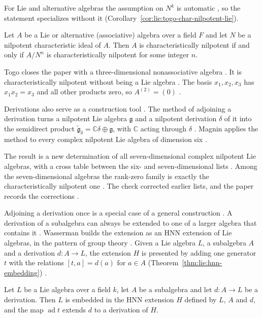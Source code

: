 For Lie and alternative algebras the assumption on $N^{k}$ is automatic
\cite[p.~211]{Togo1969}, so the statement specializes without it
(Corollary~\ref{cor:lie:togo-char-nilpotent-lie}).

\begin{corollary}\label{cor:lie:togo-char-nilpotent-lie}
Let $A$ be a Lie or alternative (associative) algebra over a field $F$
and let $N$ be a nilpotent characteristic ideal of $A$.  Then $A$ is
characteristically nilpotent if and only if $A/N^{n}$ is characteristically
nilpotent for some integer $n$.
\end{corollary}

Togo closes the paper with a three-dimensional nonassociative algebra
\cite[p.~211]{Togo1969}. It is characteristically nilpotent without being a
Lie algebra \cite[p.~211]{Togo1969}. The basis $x_1,x_2,x_3$ has $x_1x_2=x_3$
and all other products zero, so $A^{(2)}=(0)$ \cite[p.~211]{Togo1969}.

Derivations also serve as a construction tool \cite[p.~724]{Magnin2009}. The
method of adjoining a derivation turns a nilpotent Lie algebra $\mathfrak{g}$
and a nilpotent derivation $\delta$ of it into the semidirect product
$\widetilde{\mathfrak{g}}_\delta=\mathbb{C}\delta\oplus\mathfrak{g}$, with
$\mathbb{C}$ acting through $\delta$ \cite[p.~724]{Magnin2009}. Magnin applies
the method to every complex nilpotent Lie algebra of dimension six
\cite[p.~724]{Magnin2009}.

The result is a new determination of all seven-dimensional complex nilpotent
Lie algebras, with a cross table between the six- and seven-dimensional lists
\cite[p.~724]{Magnin2009}. Among the seven-dimensional algebras the rank-zero
family is exactly the characteristically nilpotent one
\cite[p.~726]{Magnin2009}. The check corrected earlier lists, and the paper
records the corrections \cite[p.~724]{Magnin2009}.

Adjoining a derivation once is a special case of a general construction
\cite[Corollary~5.2, p.~85]{Wasserman1998}. A derivation of a subalgebra can
always be extended to one of a larger algebra that contains it
\cite[Corollary~5.2, p.~85]{Wasserman1998}. Wasserman builds the extension as
an HNN extension of Lie algebras, in the pattern of group theory
\cite[p.~79]{Wasserman1998}. Given a Lie algebra $L$, a subalgebra $A$ and a
derivation $d\colon A\to L$, the extension $H$ is presented by adding one
generator $t$ with the relations $[t,a]=d(a)$ for $a\in A$
(Theorem~\ref{thm:lie:hnn-embedding})
\cite[p.~83]{Wasserman1998}.\begin{theorem}\label{thm:lie:hnn-embedding} Let $L$ be a Lie algebra
over a field $k$, let $A$ be a subalgebra and let $d\colon A\to L$ be a
derivation. Then $L$ is embedded in the HNN extension $H$ defined by $L$, $A$
and $d$, and the map $\operatorname{ad}t$ extends $d$ to a derivation of $H$.
\end{theorem}

